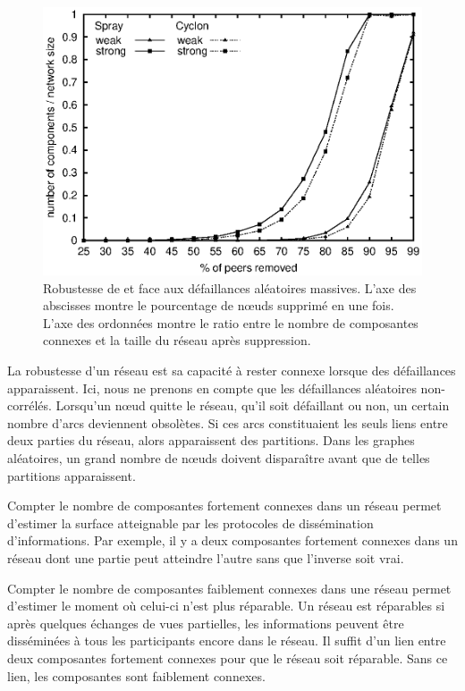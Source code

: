 \begin{figure}
  \centering
  \includegraphics[width=.8\textwidth]{img/spray/resilience.eps}
  \caption{\label{net:fig:robustness} Robustesse de \CYCLON et \SPRAY face aux
    défaillances aléatoires massives. L'axe des abscisses montre le pourcentage
    de nœuds supprimé en une fois. L'axe des ordonnées montre le ratio entre le
    nombre de composantes connexes et la taille du réseau après suppression.}
\end{figure}

La robustesse d'un réseau est sa capacité à rester connexe lorsque des
défaillances apparaissent. Ici, nous ne prenons en compte que les défaillances
aléatoires non-corrélés. Lorsqu'un nœud quitte le réseau, qu'il soit défaillant
ou non, un certain nombre d'arcs deviennent obsolètes. Si ces arcs constituaient
les seuls liens entre deux parties du réseau, alors apparaissent des partitions.
Dans les graphes aléatoires, un grand nombre de nœuds doivent disparaître avant
que de telles partitions apparaissent.

Compter le nombre de composantes fortement connexes dans un réseau permet
d'estimer la surface atteignable par les protocoles de dissémination
d'informations. Par exemple, il y a deux composantes fortement connexes dans un
réseau dont une partie peut atteindre l'autre sans que l'inverse soit
vrai.

Compter le nombre de composantes faiblement connexes dans une réseau permet
d'estimer le moment où celui-ci n'est plus réparable. Un réseau est réparables
si après quelques échanges de vues partielles, les informations peuvent être
disséminées à tous les participants encore dans le réseau. Il suffit d'un lien
entre deux composantes fortement connexes pour que le réseau soit
réparable. Sans ce lien, les composantes sont faiblement connexes.

